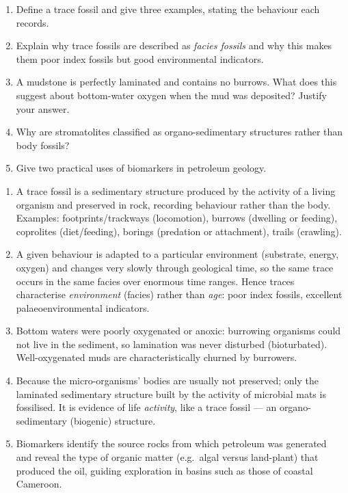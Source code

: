\documentclass[11pt]{article}
\begin{document}
\begin{exercice}
\begin{enumerate}
  \item Define a trace fossil and give three examples, stating the behaviour each records.
  \item Explain why trace fossils are described as \emph{facies fossils} and why this makes them poor index fossils but good environmental indicators.
  \item A mudstone is perfectly laminated and contains no burrows. What does this suggest about bottom-water oxygen when the mud was deposited? Justify your answer.
  \item Why are stromatolites classified as organo-sedimentary structures rather than body fossils?
  \item Give two practical uses of biomarkers in petroleum geology.
\end{enumerate}
\end{exercice}

\begin{corrige}[Exercise 1]
\begin{enumerate}
  \item A trace fossil is a sedimentary structure produced by the activity of a living organism and preserved in rock, recording behaviour rather than the body. Examples: footprints/trackways (locomotion), burrows (dwelling or feeding), coprolites (diet/feeding), borings (predation or attachment), trails (crawling).
  \item A given behaviour is adapted to a particular environment (substrate, energy, oxygen) and changes very slowly through geological time, so the same trace occurs in the same facies over enormous time ranges. Hence traces characterise \emph{environment} (facies) rather than \emph{age}: poor index fossils, excellent palaeoenvironmental indicators.
  \item Bottom waters were poorly oxygenated or anoxic: burrowing organisms could not live in the sediment, so lamination was never disturbed (bioturbated). Well-oxygenated muds are characteristically churned by burrowers.
  \item Because the micro-organisms' bodies are usually not preserved; only the laminated sedimentary structure built by the activity of microbial mats is fossilised. It is evidence of life \emph{activity}, like a trace fossil --- an organo-sedimentary (biogenic) structure.
  \item Biomarkers identify the source rocks from which petroleum was generated and reveal the type of organic matter (e.g.\ algal versus land-plant) that produced the oil, guiding exploration in basins such as those of coastal Cameroon.
\end{enumerate}
\end{corrige}
\end{document}
